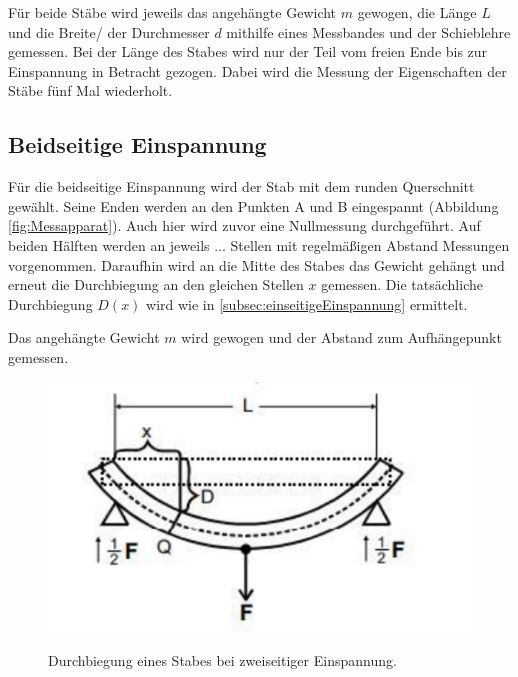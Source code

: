 Für beide Stäbe wird jeweils das angehängte Gewicht $m$ gewogen, die Länge $L$ und die Breite/ der Durchmesser $d$ mithilfe eines Messbandes und der Schieblehre gemessen.
Bei der Länge des Stabes wird nur der Teil vom freien Ende bis zur Einspannung in Betracht gezogen.
Dabei wird die Messung der Eigenschaften der Stäbe fünf Mal wiederholt.

\subsection{Beidseitige Einspannung}
Für die beidseitige Einspannung wird der Stab mit dem runden Querschnitt gewählt.
Seine Enden werden an den Punkten A und B eingespannt (Abbildung \ref{fig:Messapparat}).
Auch hier wird zuvor eine Nullmessung durchgeführt.
Auf beiden Hälften werden an jeweils ... Stellen mit regelmäßigen Abstand Messungen vorgenommen.
Daraufhin wird an die Mitte des Stabes das Gewicht gehängt und erneut die Durchbiegung an den gleichen Stellen $x$ gemessen.
Die tatsächliche Durchbiegung $D(x)$ wird wie in \ref{subsec:einseitigeEinspannung} ermittelt.

Das angehängte Gewicht $m$ wird gewogen und der Abstand zum Aufhängepunkt gemessen.

\begin{figure}
    \centering
    \includegraphics[width=\textwidth]{zweiseitig.pdf}
    \caption{Durchbiegung eines Stabes bei zweiseitiger Einspannung.} \cite{anleitung}
\end{figure}